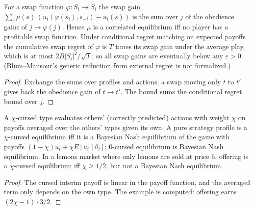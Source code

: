 \begin{theorem}
\label{thm:beh-swap-regret}
\leanok
For a swap function $\varphi:S_i\to S_i$ the swap gain $\sum_s\mu(s)\,(u_i(\varphi(s_i),s_{-i})-u_i(s))$ is the sum over $j$
of the obedience gains of $j\to\varphi(j)$. Hence $\mu$ is a correlated equilibrium iff no player has a profitable swap
function. Under conditional regret matching on expected payoffs the cumulative swap regret of $\varphi$ is $T$ times its
swap gain under the average play, which is at most $2B|S_i|^2/\sqrt T$; so all swap gains are eventually below any
$\varepsilon>0$. (Blum--Mansour's generic reduction from external regret is not formalized.)
\end{theorem}
\begin{proof}
\leanok
Exchange the sums over profiles and actions; a swap moving only $t$ to $t'$ gives back the obedience gain of $t\to t'$.
The bound sums the conditional regret bound over $j$.
\end{proof}

\begin{theorem}
\label{thm:beh-cursed}
\leanok
A $\chi$-cursed type evaluates others' (correctly predicted) actions with weight $\chi$ on payoffs averaged over the
others' types given its own. A pure strategy profile is a $\chi$-cursed equilibrium iff it is a Bayesian Nash
equilibrium of the game with payoffs $(1-\chi)u_i+\chi E[u_i\mid\theta_i]$; $0$-cursed equilibrium is Bayesian Nash
equilibrium. In a lemons market where only lemons are sold at price $6$, offering is a $\chi$-cursed equilibrium iff
$\chi\ge1/2$, but not a Bayesian Nash equilibrium.
\end{theorem}
\begin{proof}
\leanok
The cursed interim payoff is linear in the payoff function, and the averaged term only depends on the own type.
The example is computed: offering earns $(2\chi-1)\cdot3/2$.
\end{proof}

